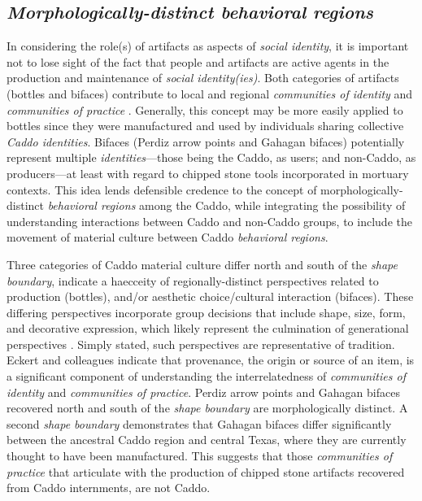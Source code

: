 \documentclass[smallextended]{svjour3}       %
\begin{document}
\hypertarget{morphologically-distinct-behavioral-regions}{%
\subsection{\texorpdfstring{\emph{Morphologically-distinct behavioral
regions}}{Morphologically-distinct behavioral regions}}\label{morphologically-distinct-behavioral-regions}}

In considering the role(s) of artifacts as aspects of \emph{social
identity}, it is important not to lose sight of the fact that people and
artifacts are active agents in the production and maintenance of
\emph{social identity(ies)}. Both categories of artifacts (bottles and
bifaces) contribute to local and regional \emph{communities of identity}
and \emph{communities of practice} \cite{RN8061}. Generally, this
concept may be more easily applied to bottles since they were
manufactured and used by individuals sharing collective \emph{Caddo
identities}. Bifaces (Perdiz arrow points and Gahagan bifaces)
potentially represent multiple \emph{identities}---those being the
Caddo, as users; and non-Caddo, as producers---at least with regard to
chipped stone tools incorporated in mortuary contexts. This idea lends
defensible credence to the concept of morphologically-distinct
\emph{behavioral regions} among the Caddo, while integrating the
possibility of understanding interactions between Caddo and non-Caddo
groups, to include the movement of material culture between Caddo
\emph{behavioral regions}.

Three categories of Caddo material culture differ north and south of the
\emph{shape boundary}, indicate a haecceity of regionally-distinct
perspectives related to production (bottles), and/or aesthetic
choice/cultural interaction (bifaces). These differing perspectives
incorporate group decisions that include shape, size, form, and
decorative expression, which likely represent the culmination of
generational perspectives \cite{RN5610}. Simply stated, such
perspectives are representative of tradition. Eckert and colleagues
\cite{RN8061} indicate that provenance, the origin or source of an item,
is a significant component of understanding the interrelatedness of
\emph{communities of identity} and \emph{communities of practice}.
Perdiz arrow points and Gahagan bifaces recovered north and south of the
\emph{shape boundary} are morphologically distinct. A second \emph{shape
boundary} demonstrates that Gahagan bifaces differ significantly between
the ancestral Caddo region and central Texas, where they are currently
thought to have been manufactured. This suggests that those
\emph{communities of practice} that articulate with the production of
chipped stone artifacts recovered from Caddo internments, are not Caddo.
\end{document}
